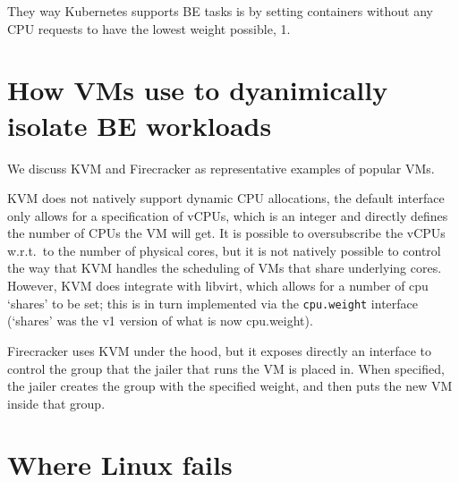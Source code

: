 They way Kubernetes supports BE tasks is by setting containers without any CPU
requests to have the lowest weight possible, \ie{} 1.



\section{How VMs use \cgroups{} to dyanimically isolate BE workloads}

We discuss KVM and Firecracker as representative examples of popular VMs.

KVM does not natively support dynamic CPU allocations, the default interface
only allows for a specification of vCPUs, which is an integer and directly
defines the number of CPUs the VM will get. It is possible to oversubscribe the
vCPUs w.r.t.\ to the number of physical cores, but it is not natively possible
to control the way that KVM handles the scheduling of VMs that share underlying
cores. However, KVM does integrate with libvirt, which allows for a number of
cpu `shares' to be set; this is in turn implemented via the \texttt{cpu.weight}
interface (`shares' was the \cgroups{} v1 version of what is now cpu.weight).

Firecracker uses KVM under the hood, but it exposes directly an interface to
control the group that the jailer that runs the VM is placed in. When specified,
the jailer creates the group with the specified weight, and then puts the new VM
inside that group.


\section{Where Linux fails}

